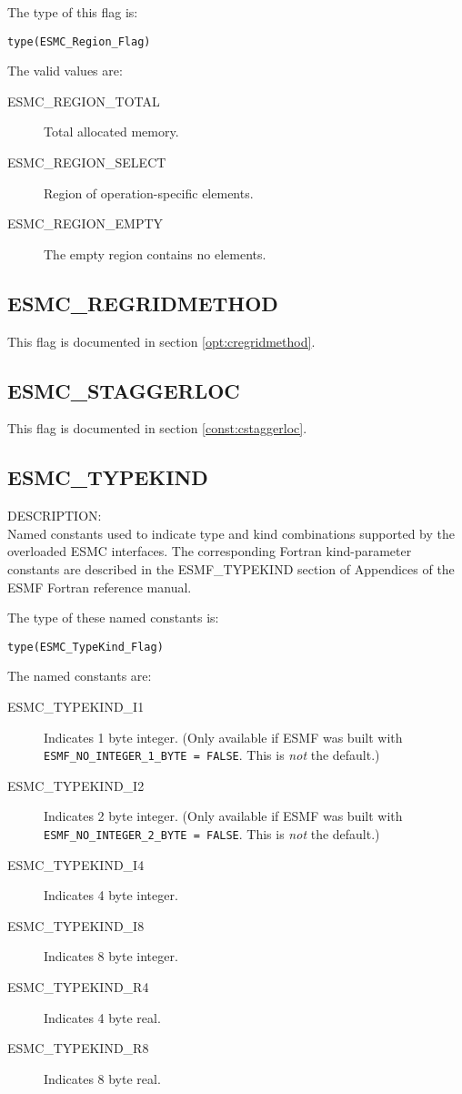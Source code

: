 The type of this flag is:

{\tt type(ESMC\_Region\_Flag)}

The valid values are:
\begin{description}
\item [ESMC\_REGION\_TOTAL]
      Total allocated memory.
\item [ESMC\_REGION\_SELECT]
      Region of operation-specific elements.
\item [ESMC\_REGION\_EMPTY]
      The empty region contains no elements.
\end{description}

\subsection{ESMC\_REGRIDMETHOD}
This flag is documented in section \ref{opt:cregridmethod}.

\subsection{ESMC\_STAGGERLOC}
This flag is documented in section \ref{const:cstaggerloc}.

\subsection{ESMC\_TYPEKIND}
\label{const:ctypekind}

{\sf DESCRIPTION:\\}
Named constants used to indicate type and kind combinations supported by the
overloaded ESMC interfaces. The corresponding Fortran kind-parameter constants 
are described in the ESMF\_TYPEKIND section of Appendices of the ESMF Fortran 
reference manual.

The type of these named constants is:

{\tt type(ESMC\_TypeKind\_Flag)}

The named constants are:
\begin{description}
\item [ESMC\_TYPEKIND\_I1]
      Indicates 1 byte integer. \newline 
      (Only available if ESMF was built with 
      {\tt ESMF\_NO\_INTEGER\_1\_BYTE = FALSE}. This is {\em not} the default.)
\item [ESMC\_TYPEKIND\_I2]
      Indicates 2 byte integer. \newline
      (Only available if ESMF was built with 
      {\tt ESMF\_NO\_INTEGER\_2\_BYTE = FALSE}. This is {\em not} the default.)
\item [ESMC\_TYPEKIND\_I4]
      Indicates 4 byte integer.
\item [ESMC\_TYPEKIND\_I8]
      Indicates 8 byte integer.
\item [ESMC\_TYPEKIND\_R4]
      Indicates 4 byte real.
\item [ESMC\_TYPEKIND\_R8]
      Indicates 8 byte real.
\end{description}


